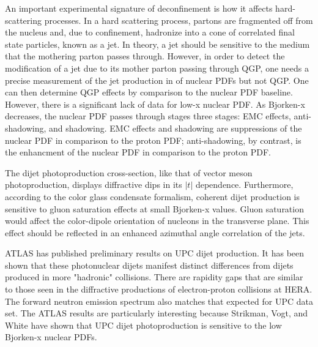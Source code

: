 An important experimental signature of deconfinement is how it affects hard-scattering processes. In a hard scattering process, partons are fragmented off from the nucleus and, due to confinement, hadronize into a cone of correlated final state particles, known as a jet. In theory, a jet should be sensitive to the medium that the mothering parton passes through. However, in order to detect the modification of a jet due to its mother parton passing through QGP, one needs a precise measurement of the jet production in of nuclear PDFs but not QGP. One can then determine QGP effects by comparison to the nuclear PDF baseline. However, there is a significant lack of data for low-x nuclear PDF. As Bjorken-x decreases, the nuclear PDF passes through stages three stages: EMC effects, anti-shadowing, and shadowing. EMC effects and shadowing are suppressions of the nuclear PDF in comparison to the proton PDF; anti-shadowing, by contrast, is the enhancment of the nuclear PDF in comparison to the proton PDF. 

The dijet photoproduction cross-section, like that of vector meson photoproduction, displays diffractive dips in its $|t|$ dependence. Furthermore, according to the color glass condensate formalism, coherent dijet production is sensitive to gluon saturation effects at small Bjorken-x values. Gluon saturation would affect the color-dipole orientation of nucleons in the transverse plane. This effect should be reflected in an enhanced azimuthal angle correlation of the jets. 

ATLAS has published preliminary results on UPC dijet production. It has been shown that these photonuclear dijets manifest distinct differences from dijets produced in more "hadronic" collisions. There are rapidity gaps that are similar to those seen in the diffractive productions of electron-proton collisions at HERA. The forward neutron emission spectrum also matches that expected for UPC data set. The ATLAS results are particularly interesting because Strikman, Vogt, and White have shown that UPC dijet photoproduction is sensitive to the low Bjorken-x nuclear PDFs.

